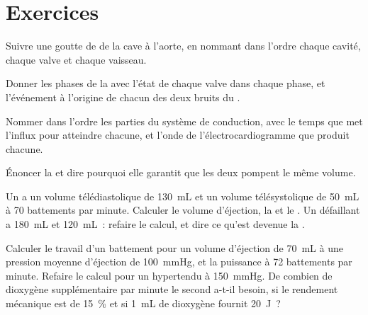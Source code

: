 \section{Exercices}

\begin{exercise}[$\star$]\label{exo:b2:heart:1}
Suivre une goutte de  de la  cave à l'aorte, en nommant dans
l'ordre chaque cavité, chaque valve et chaque vaisseau.
\end{exercise}

\begin{exercise}[$\star$]\label{exo:b2:heart:2}
Donner les phases de la  avec l'état de chaque valve
dans chaque phase, et l'événement à l'origine de chacun des deux bruits
du .
\end{exercise}

\begin{exercise}[$\star$]\label{exo:b2:heart:3}
Nommer dans l'ordre les parties du système de conduction, avec le temps
que met l'influx pour atteindre chacune, et l'onde de
l'électrocardiogramme que produit chacune.
\end{exercise}

\begin{exercise}[$\star$]\label{exo:b2:heart:4}
Énoncer la  et dire pourquoi elle garantit que les
deux  pompent le même volume.
\end{exercise}

\begin{exercise}[$\star\star$]\label{exo:b2:heart:5}
Un  a un volume télédiastolique de \qty{130}{mL} et un volume
télésystolique de \qty{50}{mL} à 70 battements par minute. Calculer le
volume d'éjection, la  et le . Un 
défaillant a \qty{180}{mL} et \qty{120}{mL}~: refaire le calcul, et dire
ce qu'est devenue la .
\end{exercise}

\begin{exercise}[$\star\star$]\label{exo:b2:heart:6}
Calculer le travail d'un battement pour un volume d'éjection de
\qty{70}{mL} à une pression moyenne d'éjection de \qty{100}{mmHg}, et la
puissance à 72 battements par minute. Refaire le calcul pour un
hypertendu à \qty{150}{mmHg}. De combien de dioxygène supplémentaire par
minute le second  a-t-il besoin, si le rendement mécanique est de
\qty{15}{\%} et si \qty{1}{mL} de dioxygène fournit \qty{20}{J}~?
\end{exercise}

